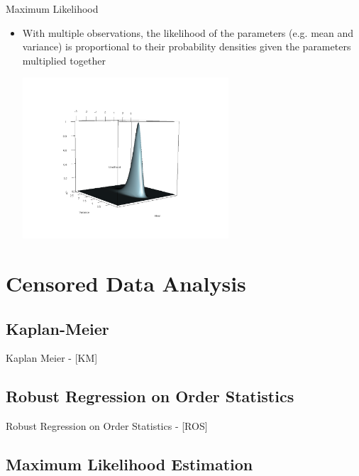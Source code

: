 \documentclass{beamer}
\begin{document}
\begin{frame}{Maximum Likelihood}
\begin{itemize}
\item With multiple observations, the likelihood of the parameters (e.g. mean and variance) is proportional to their probability densities given the parameters multiplied together
\begin{center}
\includegraphics[height=6cm]{Figure8}
\end{center}
\end{itemize}
\end{frame}


\section{Censored Data Analysis}





\subsection{Kaplan-Meier}

\begin{frame}{Kaplan Meier - [KM] }

\end{frame}

\subsection{Robust Regression on Order Statistics}

\begin{frame}{Robust Regression on Order Statistics - [ROS] }

\end{frame}


\subsection{Maximum Likelihood Estimation}
\end{document}
